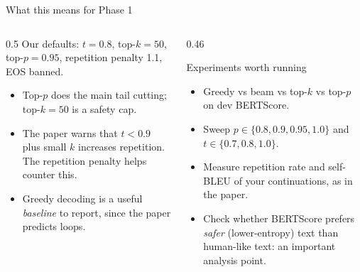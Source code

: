 \documentclass[aspectratio=169,11pt]{beamer}
\begin{document}
\begin{frame}{What this means for Phase 1}
  \begin{columns}[T]
    \begin{column}{0.5\textwidth}
      \small
      Our defaults: $t=0.8$, top-$k=50$, top-$p=0.95$, repetition penalty 1.1, EOS banned.
      \begin{itemize}
        \item Top-$p$ does the main tail cutting; top-$k=50$ is a safety cap.
        \item The paper warns that $t<0.9$ plus small $k$ increases repetition. The repetition penalty helps counter this.
        \item Greedy decoding is a useful \emph{baseline} to report, since the paper predicts loops.
      \end{itemize}
    \end{column}
    \begin{column}{0.46\textwidth}
      \begin{block}{Experiments worth running}
        \small
        \begin{itemize}
          \item Greedy vs beam vs top-$k$ vs top-$p$ on dev BERTScore.
          \item Sweep $p\in\{0.8,0.9,0.95,1.0\}$ and $t\in\{0.7,0.8,1.0\}$.
          \item Measure repetition rate and self-BLEU of your continuations, as in the paper.
          \item Check whether BERTScore prefers \emph{safer} (lower-entropy) text than human-like text: an important analysis point.
        \end{itemize}
      \end{block}
    \end{column}
  \end{columns}
\end{frame}
\end{document}
